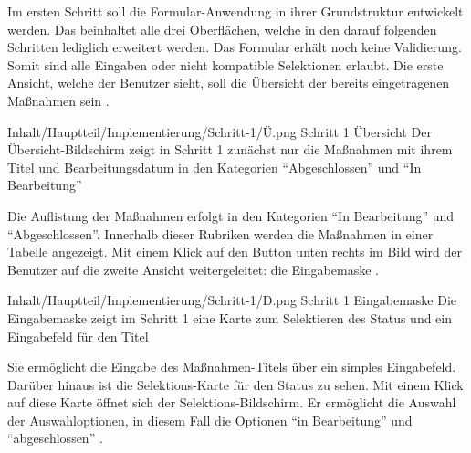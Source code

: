 Im ersten Schritt soll die Formular-Anwendung in ihrer Grundstruktur entwickelt werden.
 Das beinhaltet alle drei Oberflächen, welche in den darauf folgenden Schritten lediglich erweitert werden.  Das Formular erhält noch keine  Validierung. Somit sind alle Eingaben oder nicht kompatible Selektionen erlaubt. Die erste Ansicht, welche der Benutzer sieht, soll die Übersicht der bereits eingetragenen Maßnahmen sein \Abb{\ref{fig:Schritt1Uebersicht}}. 
 
\begin{alexfigure}{Inhalt/Hauptteil/Implementierung/Schritt-1/Ü.png}
  {Schritt 1 Übersicht}
  {Der Übersicht-Bildschirm zeigt in  Schritt 1 zunächst nur die Maßnahmen mit ihrem Titel und Bearbeitungsdatum in den Kategorien \enquote{Abgeschlossen} und \enquote{In Bearbeitung}}

  \label{fig:Schritt1Uebersicht}

\end{alexfigure}

Die Auflistung der Maßnahmen erfolgt in den Kategorien \enquote{In Bearbeitung} und \enquote{Abgeschlossen}.
Innerhalb dieser Rubriken werden die Maßnahmen in einer Tabelle angezeigt.
Mit einem Klick auf den Button unten rechts im Bild wird der Benutzer auf die zweite Ansicht weitergeleitet: die Eingabemaske \Abb{\ref{fig:Schritt1Eingabemaske}}.

\begin{alexfigure}{Inhalt/Hauptteil/Implementierung/Schritt-1/D.png}
  {Schritt 1 Eingabemaske}
  {Die Eingabemaske zeigt im Schritt 1 eine Karte zum Selektieren des Status und ein Eingabefeld für den Titel}

  \label{fig:Schritt1Eingabemaske}

\end{alexfigure}

Sie ermöglicht die Eingabe des Maßnahmen-Titels über ein simples Eingabefeld.
Darüber hinaus ist die Selektions-Karte für den Status zu sehen.
Mit einem Klick auf diese Karte öffnet sich der Selektions-Bildschirm.
Er ermöglicht die Auswahl der Auswahloptionen, in diesem Fall die Optionen \enquote{in Bearbeitung} und \enquote{abgeschlossen}
\Abb{\ref{fig:Schritt1SelektionsBildschirmStatus}}.

